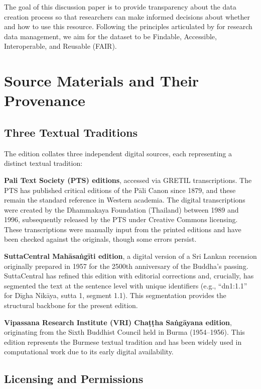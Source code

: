 \documentclass[12pt]{article}
\begin{document}
The goal of this discussion paper is to provide transparency about the data creation process so that researchers can make informed decisions about whether and how to use this resource. Following the principles articulated by \citet{wilkinson2016} for research data management, we aim for the dataset to be Findable, Accessible, Interoperable, and Reusable (FAIR).

\section{Source Materials and Their Provenance}

\subsection{Three Textual Traditions}

The edition collates three independent digital sources, each representing a distinct textual tradition:

\textbf{Pali Text Society (PTS) editions}, accessed via GRETIL transcriptions. The PTS has published critical editions of the Pāli Canon since 1879, and these remain the standard reference in Western academia. The digital transcriptions were created by the Dhammakaya Foundation (Thailand) between 1989 and 1996, subsequently released by the PTS under Creative Commons licensing. These transcriptions were manually input from the printed editions and have been checked against the originals, though some errors persist.

\textbf{SuttaCentral Mahāsaṅgīti edition}, a digital version of a Sri Lankan recension originally prepared in 1957 for the 2500th anniversary of the Buddha's passing. SuttaCentral has refined this edition with editorial corrections and, crucially, has segmented the text at the sentence level with unique identifiers (e.g., ``dn1:1.1'' for Dīgha Nikāya, sutta 1, segment 1.1). This segmentation provides the structural backbone for the present edition.

\textbf{Vipassana Research Institute (VRI) Chaṭṭha Saṅgāyana edition}, originating from the Sixth Buddhist Council held in Burma (1954--1956). This edition represents the Burmese textual tradition and has been widely used in computational work due to its early digital availability.

\subsection{Licensing and Permissions}
\end{document}
